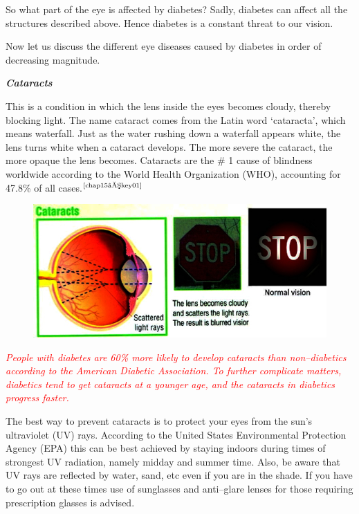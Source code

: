 So what part of the eye is affected by diabetes? Sadly, diabetes can affect all the structures described above. Hence diabetes is a constant threat to our vision.


Now let us discuss the different eye diseases caused by diabetes in order of decreasing magnitude.

\noindent\textbf{\textit{Cataracts}}

This is a condition in which the lens inside the eyes becomes cloudy, thereby blocking light. The name cataract comes from the Latin word ‘cataracta’, which means waterfall. Just as the water rushing down a waterfall appears white, the lens turns white when a cataract deve\-lops. The more severe the cataract, the more opaque the lens becomes. Cataracts are the \# 1 cause of blindness worldwide according to the World Health Organization (WHO), accounting for 47.8\% of all cases.$^{\text{\cite{chap15–key01}}}$

\begin{figure}[h]
\centering
\includegraphics[scale=3.4]{images/050.jpg}
\end{figure}

\textcolor{red}{\textit{People with diabetes are 60\% more likely to develop cataracts than non–diabetics according to the American Diabetic Association. To further complicate matters, diabetics tend to get cataracts at a younger age, and the cataracts in diabetics progress faster.}}

The best way to prevent cataracts is to protect your eyes from the sun’s ultraviolet (UV) rays. According to the United States Environmental Protection Agency (EPA) this can be best achieved by staying indoors during times of strongest UV radiation, namely midday and summer time. Also, be aware that UV rays are reflected by water, sand, etc even if you are in the shade. If you have to go out at these times use of sunglasses and anti–glare lenses for those requiring prescription glasses is advised.


